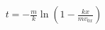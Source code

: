 \documentclass[preview]{standalone}
\begin{document}
\begin{align*}
t=-\frac{m}{k}\ln(1-\frac{kx}{mv_{0x}})
\end{align*}
\end{document}
